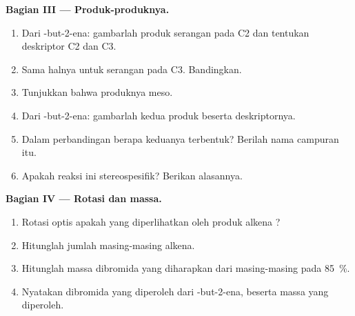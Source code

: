 \begin{problem}
\medskip
\noindent\textbf{Bagian III --- Produk-produknya.}
\begin{enumerate}[resume]
  \item Dari -but-2-ena: gambarlah produk serangan pada C2 dan
        tentukan deskriptor C2 dan C3.
  \item Sama halnya untuk serangan pada C3. Bandingkan.
  \item Tunjukkan bahwa produknya meso.
  \item Dari -but-2-ena: gambarlah kedua produk beserta
        deskriptornya.
  \item Dalam perbandingan berapa keduanya terbentuk? Berilah nama
        campuran itu.
  \item Apakah reaksi ini stereospesifik? Berikan alasannya.
\end{enumerate}

\medskip
\noindent\textbf{Bagian IV --- Rotasi dan massa.}
\begin{enumerate}[resume]
  \item Rotasi optis apakah yang diperlihatkan oleh produk alkena ?
  \item Hitunglah jumlah masing-masing alkena.
  \item Hitunglah massa dibromida yang diharapkan dari masing-masing pada
         \qty{85}{\percent}.
  \item Nyatakan  dibromida yang diperoleh dari
        -but-2-ena, beserta massa yang diperoleh.
\end{enumerate}
\end{problem}
